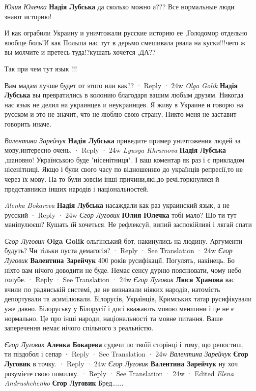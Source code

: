 \begin{itemize}

\emph{Юлия Юлечка}
\textbf{Надія Лубська} да сколько можно а???
Все нормальные люди знают историю!

И как ограбили Украину и уничтожали русские историю ее ,Голодомор отдельно
вообще боль!И как Польша нас тут в дерьмо смешивала рвала на куски!!!чего ж вы
молчите и претесь туда!?кушать хочется ,ДА??

Так при чем тут язык !!!

Вам мадам лучше будет от этого или как??
 · Reply · 24w
\emph{Olga Golik}
\textbf{Надія Лубська} вы превратились в колонию благодаря вашим любым друзям.
Никогда нас язык не делил на украинцев и неукраинцев. Я живу в Украине и говорю
на русском и это не значит, что не люблю свою страну. Никто меня не заставит
говорить иначе.

\emph{Валентина Зарейчук}
\textbf{Надія Лубська} приведите пример уничтожения людей за мову,интересно очень.
 · Reply · 24w
\emph{Lyusya Khramova}
\textbf{Надія Лубська} ,шановно! Українською буде "нісенітниця". І ваш коментар як раз і є прикладом нісенітниці. Якщо і були свого часу по відношенню до українців репресії,то не через їх мову. На то були зовсім інші причини,які,до речі,торкнулися й представників інших народів і національностей.

\emph{Alenka Bokareva}
\textbf{Надія Лубська} насаждали как раз украинский язык, а не русский
 · Reply · 24w
\emph{Єгор Луговик}
\textbf{Юлия Юлечка} тобі мало? Що ти тут маніпулюєш? Кушать їй хочеться. Не
рефлексуй, випий заспокійливі і лягай спати

\emph{Єгор Луговик}
\textbf{Olga Golik} ольгінський бот, накинулись на людину. Аргументи будуть? Чи тільки пуста демагогія?
 · Reply · See Translation · 24w
\emph{Єгор Луговик}
\textbf{Валентина Зарейчук} 400 років русифікації. Погулять, накінець. Бо ніхто вам нічого доводити не буде. Немає сенсу дурню пояснювати, чому небо голубе.
 · Reply · See Translation · 24w
\emph{Єгор Луговик}
\textbf{Люся Храмова} вас вчили по радянській системі, де не визнавали ніяких
народів, натомість депортували та асимілювали. Білорусів, Українців, Кримських
татар русифікували уже давно. Білоруську у Білорусії і досі вважають мовою
меншини і це не є нормально. Це про інші народи, національності та мовне
питання. Ваше заперечення немає нічого спільного з реальністю.

\emph{Єгор Луговик}
\textbf{Аленка Бокарева} судячи по твоїй сторінці і тому, що репостиш, ти піздобол і сепар
 · Reply · See Translation · 24w
\emph{Валентина Зарейчук}
\textbf{Єгор Луговик} в точку.
 · Reply · 24w
\emph{Єгор Луговик}
\textbf{Валентина Зарейчук} ну хоч розумієте свою помилку.
 · Reply · See Translation · 24w · Edited
\emph{Elena Andrushchenko}
\textbf{Єгор Луговик} Бред......


\end{itemize}

